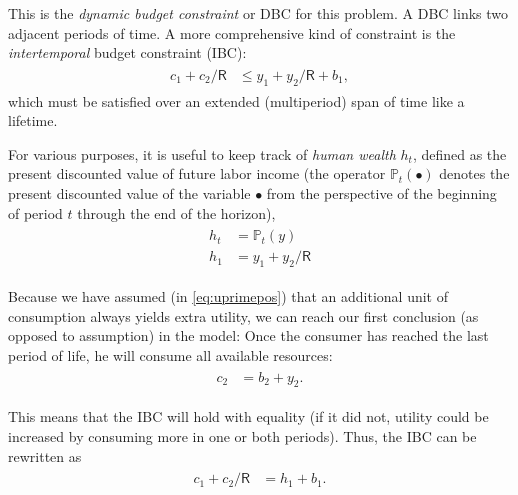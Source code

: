 \documentclass{scrartcl}
\begin{document}
  This is the \textit{dynamic budget constraint} or DBC for this problem.
  A DBC links two adjacent periods of time.
  A more comprehensive kind of constraint is the \textit{intertemporal} budget constraint (IBC):
  \begin{equation}\begin{gathered}\begin{aligned} \boldsymbol{\mathit{c}}_{1}+\boldsymbol{\mathit{c}}_{2}/\mathsf{R} & \leq \boldsymbol{\mathit{y}}_{1}+\boldsymbol{\mathit{y}}_{2}/\mathsf{R}+\boldsymbol{\mathit{b}}_{1} \label{eq:ibcineq},
      \end{aligned}\end{gathered}\end{equation} which must be satisfied over an extended (multiperiod) span of time like a lifetime.

  For various purposes, it is useful to keep track of \textit{human wealth} $\boldsymbol{\mathit{h}}_{t}$, defined as the present discounted value of future labor income (the operator ${\mathbb{P}}_{t}(\bullet)$ denotes the present discounted value of the variable $\bullet$ from the perspective of the beginning of period $t$ through the end of the horizon),
  \begin{equation}\begin{gathered}\begin{aligned} \boldsymbol{\mathit{h}}_{t} & = {\mathbb{P}}_{t}(y) \label{eq:humw} \\ \boldsymbol{\mathit{h}}_{1} & = \boldsymbol{\mathit{y}}_{1}+\boldsymbol{\mathit{y}}_{2}/\mathsf{R}
      \end{aligned}\end{gathered}\end{equation}

  Because we have assumed (in \eqref{eq:uprimepos}) that an additional unit of consumption always yields extra utility, we can reach our first conclusion (as opposed to assumption) in the model: Once the consumer has reached the last period of life, he will consume all available resources:
  \begin{equation}\begin{gathered}\begin{aligned} \boldsymbol{\mathit{c}}_{2} & = \boldsymbol{\mathit{b}}_{2}+\boldsymbol{\mathit{y}}_{2}.
      \end{aligned}\end{gathered}\end{equation}

  This means that the IBC will hold with equality (if it did not, utility could be increased by consuming more in one or both periods).
  Thus, the IBC can be rewritten as
  \begin{equation}\begin{gathered}\begin{aligned} \boldsymbol{\mathit{c}}_{1}+\boldsymbol{\mathit{c}}_{2}/\mathsf{R} & = \boldsymbol{\mathit{h}}_{1}+\boldsymbol{\mathit{b}}_{1} \label{eq:ibc}.
      \end{aligned}\end{gathered}\end{equation}
\end{document}
